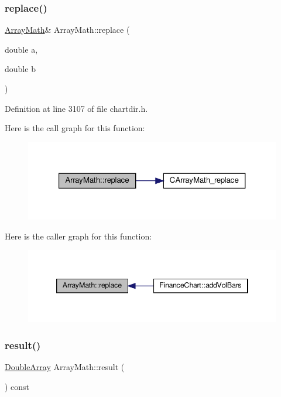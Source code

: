 \subsubsection{\texorpdfstring{replace()}{replace()}}
{\footnotesize\ttfamily \hyperlink{class_array_math}{Array\+Math}\& Array\+Math\+::replace (\begin{DoxyParamCaption}\item[{double}]{a,  }\item[{double}]{b }\end{DoxyParamCaption})\hspace{0.3cm}{\ttfamily [inline]}}



Definition at line 3107 of file chartdir.\+h.

Here is the call graph for this function\+:
\nopagebreak
\begin{figure}[H]
\begin{center}
\leavevmode
\includegraphics[width=321pt]{class_array_math_a3e735bfc88ee0149c7056cac1defbf6c_cgraph}
\end{center}
\end{figure}
Here is the caller graph for this function\+:
\nopagebreak
\begin{figure}[H]
\begin{center}
\leavevmode
\includegraphics[width=346pt]{class_array_math_a3e735bfc88ee0149c7056cac1defbf6c_icgraph}
\end{center}
\end{figure}
\mbox{\label{class_array_math_a2c81268f37eb5e4ab9c1c8e18bb22fa3}} 
\subsubsection{\texorpdfstring{result()}{result()}}
{\footnotesize\ttfamily \hyperlink{class_double_array}{Double\+Array} Array\+Math\+::result (\begin{DoxyParamCaption}{ }\end{DoxyParamCaption}) const\hspace{0.3cm}{\ttfamily [inline]}}



